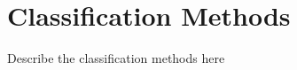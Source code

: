 \chapter{Classification Methods}
\label{chapter:Classification Methods}

Describe the classification methods here

